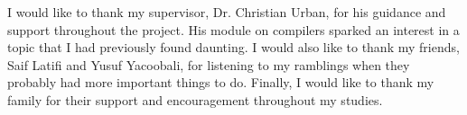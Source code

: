 I would like to thank my supervisor, Dr. Christian Urban, for his guidance and support throughout
the project. His module on compilers sparked an interest in a topic that I had previously found
daunting. I would also like to thank my friends, Saif Latifi and Yusuf Yacoobali, for listening to
my ramblings when they probably had more important things to do. Finally, I would like to thank my
family for their support and encouragement throughout my studies.
